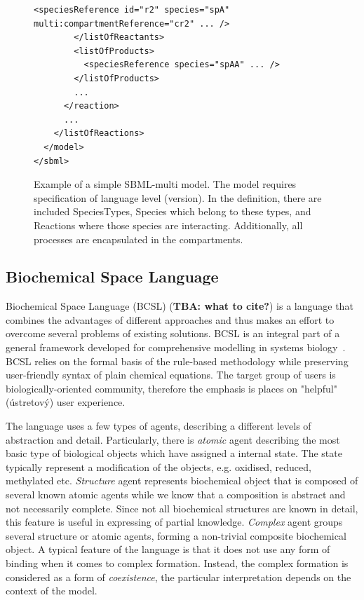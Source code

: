 \documentclass[11pt,a4paper]{report}
\begin{document}
\begin{figure}[!h]
\begin{lstlisting}[basicstyle=\scriptsize, frame=single]
          <speciesReference id="r2" species="spA" multi:compartmentReference="cr2" ... />
        </listOfReactants>
        <listOfProducts>
          <speciesReference species="spAA" ... />
        </listOfProducts>
        ...
      </reaction>
      ...
    </listOfReactions>
  </model>
</sbml>
\end{lstlisting}
\caption{Example of a simple SBML-multi model. The model requires specification of language level (version). In the definition, there are included SpeciesTypes, Species which belong to these types, and Reactions where those species are interacting. Additionally, all processes are encapsulated in the compartments.}\label{SBML_example}
\end{figure}

\subsection{Biochemical Space Language}

Biochemical Space Language (BCSL) (\textbf{TBA: what to cite?}) is a language that combines the advantages of different approaches and thus makes an effort to overcome several problems of existing solutions. BCSL is an integral part of a general framework developed for comprehensive modelling in systems biology~\cite{cs2bio2013,BCS}. BCSL relies on the formal basis of the rule-based methodology while preserving user-friendly syntax of plain chemical equations. The target group of users is biologically-oriented community, therefore the emphasis is places on "helpful" (ústretový) user experience.

The language uses a few types of agents, describing a different levels of abstraction and detail. Particularly, there is \emph{atomic} agent describing the most basic type of biological objects which have assigned a internal state. The state typically represent a modification of the objects, e.g. oxidised, reduced, methylated etc. \emph{Structure} agent represents biochemical object that is composed of several known atomic agents while we know that a composition is abstract and not necessarily complete. Since not all biochemical structures are known in detail, this feature is useful in expressing of partial knowledge. \emph{Complex} agent groups several structure or atomic agents, forming a non-trivial composite biochemical object. A typical feature of the language is that it does not use any form of binding when it comes to complex formation. Instead, the complex formation is considered as a form of \emph{coexistence}, the particular interpretation depends on the context of the model. 
\end{document}
